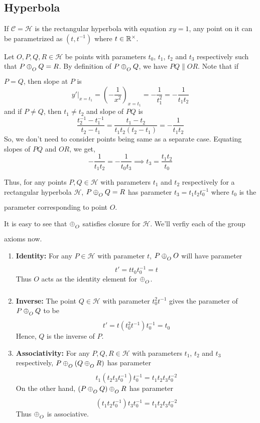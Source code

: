 \subsection*{Hyperbola}

If $\mathcal{C}=\mathcal{H}$ is the rectangular hyperbola with equation $xy=1$,
any point on it can be parametrized as $(t,t^{-1})$ where $t\in\mathbb{R}^\times$.
\vspace{1ex}

Let $O,P,Q,R\in\mathcal{H}$ be points with parameters $t_0$, $t_1$, $t_2$ and
$t_3$ respectively such that $P \conop Q = R$. By definition of $P \conop Q$, we
have $PQ \parallel OR$. Note that if $P=Q$, then slope at $P$ is
\[
    y'|_{x=t_1} = \left(-\frac{1}{x^2}\right)_{x=t_1}
    = -\frac{1}{t_1^2} = -\frac{1}{t_1 t_2}
\]
and if $P \neq Q$, then $t_1 \neq t_2$ and slope of $PQ$ is 
\[
    \frac{t_2^{-1}-t_1^{-1}}{t_2-t_1} = \frac{t_1 - t_2}{t_1 t_2 (t_2 - t_1)}
    = -\frac{1}{t_1 t_2}
\]
So, we don't need to consider points being same as a separate case. Equating
slopes of $PQ$ and $OR$, we get,
\[ -\frac{1}{t_1 t_2} = -\frac{1}{t_0 t_3} \implies t_3 = \frac{t_1 t_2}{t_0} \]

Thus, for any points $P,Q\in\mathcal{H}$ with parameters $t_1$ and $t_2$
respectively for a rectangular hyperbola $\mathcal{H}$, $P \conop Q = R$ has
parameter $t_3 = t_1 t_2 t_0^{-1}$ where $t_0$ is the parameter corresponding to
point $O$.
\vspace{1ex}

It is easy to see that $\conop$ satisfies closure for $\mathcal{H}$. We'll verfiy
each of  the group axioms now.

\begin{enumerate}
    \item{\textbf{Identity:}} For any $P\in\mathcal{H}$ with parameter $t$,
        $P \conop O$ will have parameter
        \[ t' = t t_0 t_0^{-1} = t \]
        Thus $O$ acts as the identity element for $\conop$.

    \item{\textbf{Inverse:}} The point $Q\in\mathcal{H}$ with parameter
        $t_0^2 t^{-1}$ gives the parameter of $P \conop Q$ to be
        \[ t' = t (t_0^2 t^{-1}) t_0^{-1} = t_0 \]
        Hence, $Q$ is the inverse of $P$.

    \item{\textbf{Associativity:}} For any $P,Q,R\in\mathcal{H}$ with parameters
        $t_1$, $t_2$ and $t_3$ respectively, $P\conop(Q \conop R)$ has parameter
        \[ t_1 (t_2 t_3 t_0^{-1}) t_0^{-1} = t_1 t_2 t_3 t_0^{-2} \]
        On the other hand, $(P \conop Q)\conop R$ has parameter
        \[ (t_1 t_2 t_0^{-1}) t_3 t_0^{-1} = t_1 t_2 t_3 t_0^{-2} \]
        Thus $\conop$ is associative.
\end{enumerate}

